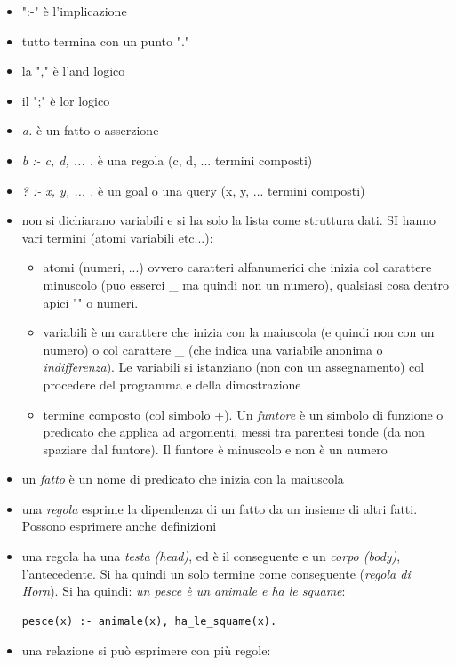 \documentclass[a4paper,12pt, oneside]{book}
\begin{document}
\begin{itemize}
\item ":-" è l'implicazione
\item tutto termina con un punto "."
\item la "," è l'and logico
\item il ";" è lor logico
\item \textit{a.} è un fatto o asserzione
\item \textit{b :- c, d, ... .} è una regola (c, d, ... termini composti)
\item \textit{? :- x, y, ... .} è un goal o una query (x, y, ... termini composti)
\item non si dichiarano variabili e si ha solo la lista come struttura dati. SI hanno vari termini (atomi variabili etc...):
\begin{itemize}
\item atomi (numeri, ...) ovvero caratteri alfanumerici che inizia col carattere minuscolo (puo esserci \_ ma quindi non un numero), qualsiasi cosa dentro apici "" o numeri.
\item variabili è un carattere che inizia con la maiuscola (e quindi non con un numero) o col carattere \_ (che indica una variabile anonima o \textit{indifferenza}). Le variabili si istanziano (non con un assegnamento) col procedere del programma e della dimostrazione
\item termine composto (col simbolo +). Un \textit{funtore} è un simbolo di funzione o predicato che applica ad argomenti, messi tra parentesi tonde (da non spaziare dal funtore). Il funtore è minuscolo e non è un numero
\end{itemize}
\item un \textit{fatto} è un nome di predicato che inizia con la maiuscola
\item una \textit{regola} esprime la dipendenza di un fatto da un insieme di altri fatti. Possono esprimere anche definizioni
\item una regola ha una \textit{testa (head)}, ed è il conseguente e un \textit{corpo (body)}, l'antecedente. Si ha quindi un solo termine come conseguente (\textit{regola di Horn}). Si ha quindi:
\textit{un pesce è un animale e ha le squame}: 
\begin{verbatim}
pesce(x) :- animale(x), ha_le_squame(x).
\end{verbatim}
\item una relazione si può esprimere con più regole:

\end{itemize}
\end{document}
